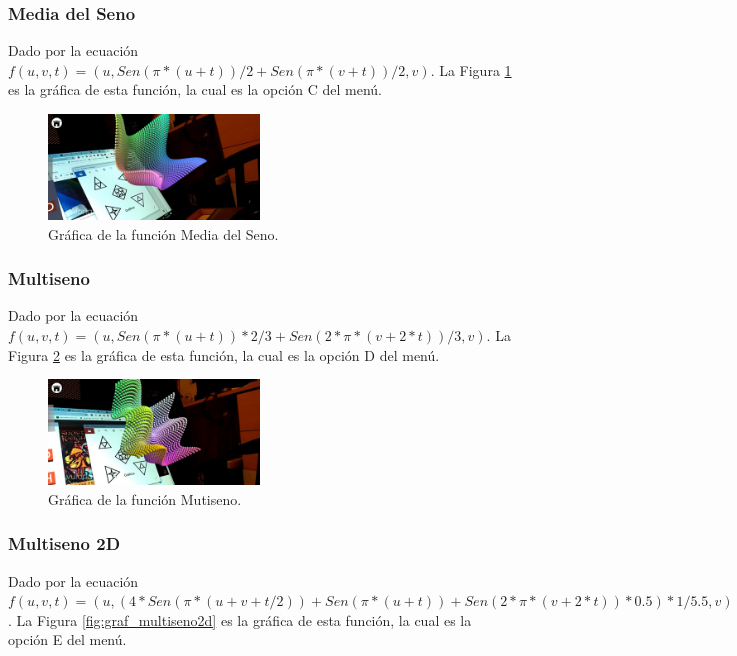 \subsubsection{Media del Seno}
Dado por la ecuación $f(u,v,t)=(u,Sen(\pi * (u + t))/2+Sen(\pi * (v+ t))/2,v)$. La Figura \ref{fig:graf_media_seno} es la gráfica de esta función, la cual es la opción C del menú.

\begin{figure}[hbt!]
\centering
\includegraphics[width=0.5\textwidth]{figuras/graficas/media_seno.png}
\caption{\label{fig:graf_media_seno}Gráfica de la función Media del Seno.}
\end{figure}
\FloatBarrier

\subsubsection{Multiseno}
Dado por la ecuación $f(u,v,t)=(u,Sen(\pi * (u + t))*2/3+Sen(2 * \pi * (v + 2 * t))/3,v)$. La Figura \ref{fig:graf_multiseno} es la gráfica de esta función, la cual es la opción D del menú.

\begin{figure}[hbt!]
\centering
\includegraphics[width=0.5\textwidth]{figuras/graficas/multiseno.png}
\caption{\label{fig:graf_multiseno}Gráfica de la función Mutiseno.}
\end{figure}
\FloatBarrier

\subsubsection{Multiseno 2D}
Dado por la ecuación $f(u,v,t)=(u, (4 * Sen(\pi * (u + v + t / 2)) + Sen(\pi * (u + t)) + Sen(2 * \pi * (v + 2 * t)) * 0.5) * 1 / 5.5,v)$. La Figura \ref{fig:graf_multiseno2d} es la gráfica de esta función, la cual es la opción E del menú.

